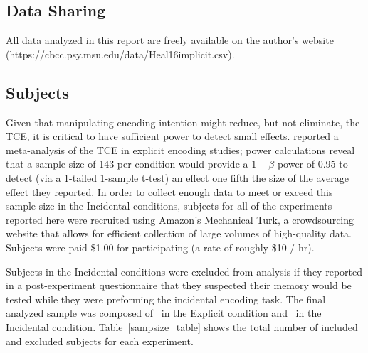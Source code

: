 \documentclass[jou,natbib,floatsintext]{apa6} %
\begin{document}
\subsection{Data Sharing}All data analyzed in this report are freely available on the author's website (https://cbcc.psy.msu.edu/data/Heal16implicit.csv).

\subsection{Subjects}

Given that manipulating encoding intention might reduce, but not eliminate, the TCE, it is critical to have sufficient power to detect small effects. \citet{SedeEtal10} reported a meta-analysis of the TCE in explicit encoding studies; power calculations reveal that a sample size of 143 per condition would provide a $1-\beta$ power of 0.95 to detect (via a 1-tailed 1-sample t-test) an effect one fifth the size of the average effect they reported. 
In order to collect enough data to meet or exceed this sample size in the Incidental conditions, subjects for all of the experiments reported here were recruited using Amazon's Mechanical Turk, a crowdsourcing website that allows for efficient collection of large volumes of high-quality data. Subjects were paid \$1.00 for participating (a rate of roughly \$10 / hr).

Subjects in the Incidental conditions were excluded from analysis if they reported in a post-experiment questionnaire that they suspected their memory would be tested while they were preforming the incidental encoding task. The final analyzed sample was composed of \shoeExplicitIncluded~in the Explicit condition and \shoeIncidentalIncluded~in the Incidental condition. Table~\ref{sampsize_table} shows the total number of included and excluded subjects for each experiment.
\end{document}
